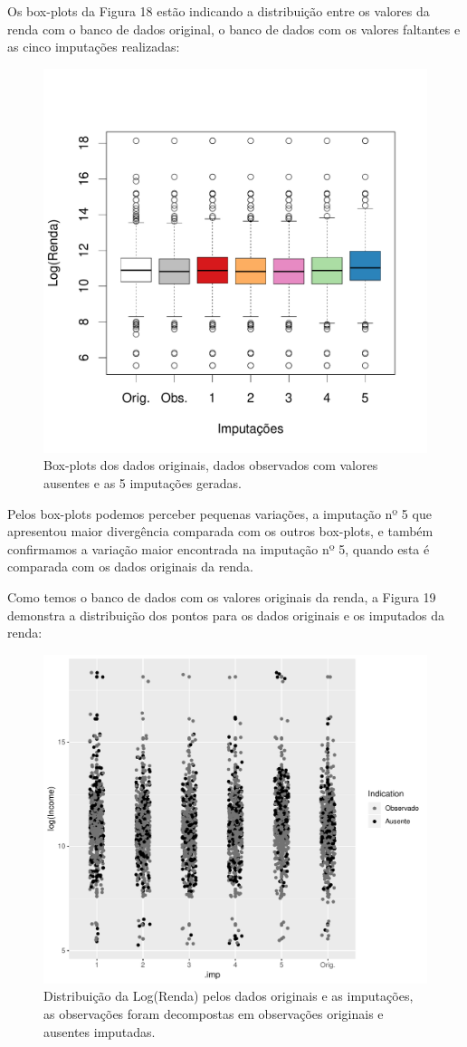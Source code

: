 \documentclass[]{article}
\begin{document}
Os box-plots da Figura 18 estão indicando a distribuição entre os
valores da renda com o banco de dados original, o banco de dados com os
valores faltantes e as cinco imputações realizadas:

\begin{figure}[H]

{\centering \includegraphics[width=0.6\linewidth]{p55-graf} 

}

\caption{Box-plots dos dados originais, dados observados com valores ausentes e as 5 imputações geradas.}\label{fig:unnamed-chunk-26}
\end{figure}

Pelos box-plots podemos perceber pequenas variações, a imputação nº 5
que apresentou maior divergência comparada com os outros box-plots, e
também confirmamos a variação maior encontrada na imputação nº 5, quando
esta é comparada com os dados originais da renda.

Como temos o banco de dados com os valores originais da renda, a Figura
19 demonstra a distribuição dos pontos para os dados originais e os
imputados da renda:

\begin{figure}[H]

{\centering \includegraphics[width=0.6\linewidth]{Relatorio_IC_files/figure-latex/unnamed-chunk-27-1} 

}

\caption{Distribuição da Log(Renda) pelos dados originais e as imputações, as observações foram decompostas em observações originais e ausentes imputadas.}\label{fig:unnamed-chunk-27}
\end{figure}
\end{document}
